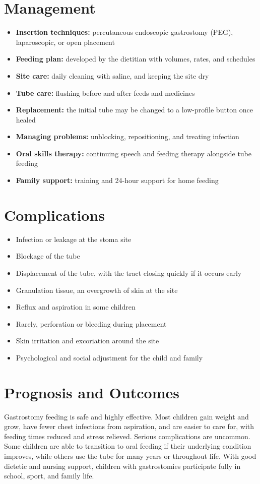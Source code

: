 \section*{Management}
\begin{itemize}
    \item \textbf{Insertion techniques:} percutaneous endoscopic gastrostomy (PEG), laparoscopic, or open placement
    \item \textbf{Feeding plan:} developed by the dietitian with volumes, rates, and schedules
    \item \textbf{Site care:} daily cleaning with saline, and keeping the site dry
    \item \textbf{Tube care:} flushing before and after feeds and medicines
    \item \textbf{Replacement:} the initial tube may be changed to a low-profile button once healed
    \item \textbf{Managing problems:} unblocking, repositioning, and treating infection
    \item \textbf{Oral skills therapy:} continuing speech and feeding therapy alongside tube feeding
    \item \textbf{Family support:} training and 24-hour support for home feeding
\end{itemize}

\section*{Complications}
\begin{itemize}
    \item Infection or leakage at the stoma site
    \item Blockage of the tube
    \item Displacement of the tube, with the tract closing quickly if it occurs early
    \item Granulation tissue, an overgrowth of skin at the site
    \item Reflux and aspiration in some children
    \item Rarely, perforation or bleeding during placement
    \item Skin irritation and excoriation around the site
    \item Psychological and social adjustment for the child and family
\end{itemize}

\section*{Prognosis and Outcomes}
Gastrostomy feeding is safe and highly effective. Most children gain weight and grow, have fewer chest infections from aspiration, and are easier to care for, with feeding times reduced and stress relieved. Serious complications are uncommon. Some children are able to transition to oral feeding if their underlying condition improves, while others use the tube for many years or throughout life. With good dietetic and nursing support, children with gastrostomies participate fully in school, sport, and family life.

